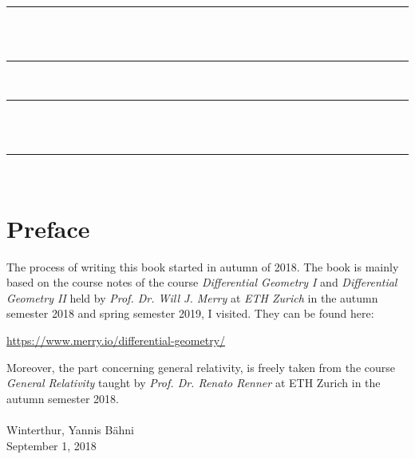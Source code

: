 


\pagecolor{blue}
\color{white}

\begin{titlepage}
	\begin{center}
	\rule{\linewidth}{0.5mm} \\[0.4cm]
	\\
	\rule{\linewidth}{0.5mm} \\[1.5cm]
	\end{center}
\end{titlepage}
\nopagecolor
\color{black} 

\frontmatter

\thispagestyle{empty}
	\begin{center}
	\rule{\linewidth}{0.5mm} \\[0.4cm]
	\\
	\rule{\linewidth}{0.5mm} \\[1.5cm]
\end{center}
\clearpage

\chapter*{Preface}
The process of writing this book started in autumn of 2018. The book is mainly based on the course notes of the course \emph{Differential Geometry I} and \emph{Differential Geometry II} held by \emph{Prof. Dr. Will J. Merry} at \emph{ETH Zurich} in the autumn semester 2018 and spring semester 2019, I visited. They can be found here:
\begin{center}
	\href{https://www.merry.io/differential-geometry/}{https://www.merry.io/differential-geometry/}
\end{center}
Moreover, the part concerning general relativity, is freely taken from the course \emph{General Relativity} taught by \emph{Prof. Dr. Renato Renner} at ETH Zurich in the autumn semester 2018.\\
\\
\noindent Winterthur, \hfill Yannis B\"ahni\\
September 1, 2018
\tableofcontents

\mainmatter

%




\appendix
\begin{appendix}

\end{appendix}

\printbibliography


